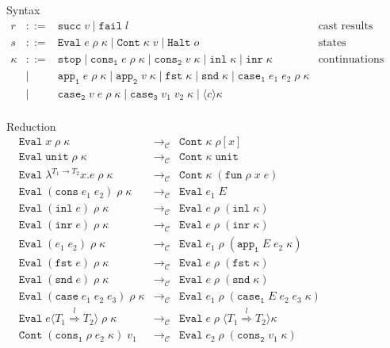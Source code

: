 \documentclass[acmsmall,review,anonymous]{acmart}\settopmatter{printfolios=true,printccs=false,printacmref=false}
\newcommand{\stxrule}[3]{#1 & ::= & #3 & \text{#2}\\}
\newcommand{\stxrulecont}[1]{& | & #1 & \\}
\newcommand{\sOOinspect}[3]{\mathtt{Eval} \; #1 \; #2 \; #3}
\newcommand{\sOOreturn}[2]{\mathtt{Cont} \; #2 \; #1}
\newcommand{\sOOhalt}[1]{\mathtt{Halt} \; #1}
\newcommand{\eOOvar}[1]{#1}
\newcommand{\eOOsole}[0]{\mathtt{unit}}
\newcommand{\eOOlam}[4]{\lambda^{#1\rightarrow{}#2}#3.#4}
\newcommand{\eOOapp}[2]{#1 \; #2}
\newcommand{\eOOcons}[2]{\mathtt{cons} \; #1 \; #2}
\newcommand{\eOOcar}[1]{\mathtt{fst} \; #1}
\newcommand{\eOOcdr}[1]{\mathtt{snd} \; #1}
\newcommand{\eOOinl}[1]{\mathtt{inl} \; #1}
\newcommand{\eOOinr}[1]{\mathtt{inr} \; #1}
\newcommand{\eOOcase}[3]{\mathtt{case} \; #1 \; #2 \; #3}
\newcommand{\eOOcast}[4]{#1 \langle \cOOcast{#2}{#3}{#4} \rangle}
\newcommand{\cOOcast}[3]{#1 \overset{#2}{\Rightarrow} #3}
\newcommand{\vOOfun}[3]{\mathtt{fun} \; #1 \; #2 \; #3}
\newcommand{\vOOtt}[0]{\mathtt{unit}}
\newcommand{\rOOsucc}[1]{\mathtt{succ}\;#1}
\newcommand{\rOOfail}[1]{\mathtt{fail}\;#1}
\newcommand{\kOOmt}[0]{\mathtt{stop}}
\newcommand{\kOOconsI}[3]{\mathtt{cons_1} \; #1 \; #2 \; #3}
\newcommand{\kOOconsII}[2]{\mathtt{cons_2} \; #1 \; #2}
\newcommand{\kOOinl}[1]{\mathtt{inl} \; #1}
\newcommand{\kOOinr}[1]{\mathtt{inr} \; #1}
\newcommand{\kOOappI}[3]{
	\mathtt{app_1} \; #1 \; #2 \; #3
}
\newcommand{\kOOappII}[2]{
	\mathtt{app_2} \; #1 \; #2}
\newcommand{\kOOcar}[1]{
	\mathtt{fst} \; #1}
\newcommand{\kOOcdr}[1]{
	\mathtt{snd} \; #1}
\newcommand{\kOOcaseI}[4]{
	\mathtt{case_1} \; #1 \; #2 \; #3 \; #4}
\newcommand{\kOOcaseII}[4]{
	\mathtt{case_2} \; #1 \; #2 \; #3 \; #4}
\newcommand{\kOOcaseIII}[3]{
	\mathtt{case_3} \; #1 \; #2 \; #3}
\newcommand{\kOOcast}[2]{
	\langle #1 \rangle #2}
\newcommand{\judgeCreduce}[2]{#1 \longrightarrow_{\mathcal{C}} #2}
\newcommand{\redrule}[3]{#1 & \longrightarrow_\mathcal{C} & #2 & #3\\}
\begin{document}
\begin{figure}
	
	Syntax
	\[
	\begin{array}{rclr}
	\stxrule{r}{cast results}{
		\rOOsucc{v} \mid
		\rOOfail{l}
	}
	\stxrule{s}{states}{
		\sOOinspect{e}{\rho}{\kappa} \mid{}
		\sOOreturn{v}{\kappa} \mid{}
		\sOOhalt{o}
	}
	
	\stxrule{\kappa}{continuations}{
		\kOOmt \mid
		\kOOconsI{e}{\rho}{\kappa} \mid
		\kOOconsII{v}{\kappa} \mid
		\kOOinl{\kappa} \mid
		\kOOinr{\kappa}
	}
	\stxrulecont{
		\kOOappI{e}{\rho}{\kappa} \mid
		\kOOappII{v}{\kappa} \mid
		\kOOcar{\kappa} \mid
		\kOOcdr{\kappa} \mid
		\kOOcaseI{e_1}{e_2}{\rho}{\kappa}
	}
	\stxrulecont{	
		\kOOcaseII{v}{e}{\rho}{\kappa} \mid
		\kOOcaseIII{v_1}{v_2}{\kappa} \mid
		\kOOcast{c}{\kappa}
	}
	\end{array}
	\]
	
	Reduction \fbox{$ \judgeCreduce{s}{s} $}
	\[
	\begin{array}{rclr}
	\redrule{
		\sOOinspect{\eOOvar{x}}{\rho}{\kappa}
	}{	
		\sOOreturn{\rho[x]}{\kappa}
	}{}
	\redrule{
		\sOOinspect{\eOOsole}{\rho}{\kappa}
	}{
		\sOOreturn{\vOOtt}{\kappa}
	}{}
	\redrule{
		\sOOinspect{\eOOlam{T_1}{T_2}{x}{e}}{\rho}{\kappa}
	}{
		\sOOreturn{(\vOOfun{\rho}{x}{e})}{\kappa}
	}{}
	\redrule{
		\sOOinspect{(\eOOcons{e_1}{e_2})}{\rho}{\kappa}
	}{
		\sOOinspect{e_1}{E}{}
	}{}
	\redrule{
		\sOOinspect{(\eOOinl{e})}{\rho}{\kappa}
	}{
		\sOOinspect{e}{\rho}{(\kOOinl{\kappa})}
	}{}
	\redrule{
	\sOOinspect{(\eOOinr{e})}{\rho}{\kappa}
	}{
	\sOOinspect{e}{\rho}{(\kOOinr{\kappa})}
	}{}
	\redrule{
		\sOOinspect{(\eOOapp{e_1}{e_2})}{\rho}{\kappa}
	}{
\sOOinspect{e_1}{\rho}{(\kOOappI{E}{e_2}{\kappa})}}{}
\redrule{
\sOOinspect{(\eOOcar{e})}{\rho}{\kappa}}{
\sOOinspect{e}{\rho}{(\kOOcar{\kappa})}}{}
\redrule{
	\sOOinspect{(\eOOcdr{e})}{\rho}{\kappa}}{
	\sOOinspect{e}{\rho}{(\kOOcdr{\kappa})}}{}
\redrule{
\sOOinspect{(\eOOcase{e_1}{e_2}{e_3})}{\rho}{\kappa}}{
\sOOinspect{e_1}{\rho}{(\kOOcaseI{E}{e_2}{e_3}{\kappa})}}{}
	\redrule{
		\sOOinspect{\eOOcast{e}{T_1}{l}{T_2}}{\rho}{\kappa}
	}{
		\sOOinspect{e}{\rho}{\langle\cOOcast{T_1}{l}{T_2}\rangle\kappa}
	}{}

\redrule{
\sOOreturn{v_1}{(\kOOconsI{\rho}{e_2}{\kappa})}}{
\sOOinspect{e_2}{\rho}{(\kOOconsII{v_1}{\kappa})}}{}


\end{array}\]
\end{figure}
\end{document}
